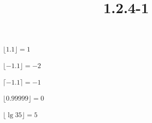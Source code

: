 \documentclass{article}
\title{1.2.4-1}
\begin{document}
\maketitle

$\lfloor 1.1 \rfloor = 1$

$\lfloor -1.1 \rfloor = -2$

$\lceil -1.1 \rceil = -1$

$\lfloor 0.99999 \rfloor = 0$

$\lfloor \lg{35} \rfloor = 5$
\end{document}
